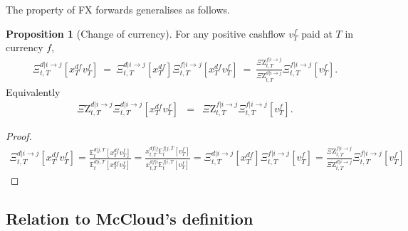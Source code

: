 \documentclass[11pt,english]{amsart}
\newcommand{\EE}{\mathbb{E}}
\newcommand{\Q}{\Xi}
\newcommand{\QZ}{{\Xi\mathrm{Z}}}
\theoremstyle{definition}
\newtheorem{prop}{Proposition}
\newtheorem{rema}{Remark}
\begin{document}
The property of FX forwards generalises as follows.

\begin{prop}[Change of currency]
For any positive cashflow $v^f_T$ paid at $T$ in currency $f$, 
\begin{eqnarray}
  \Q^{d|i\to j}_{t,T}[x^{df}_Tv^f_T]  ~=~  \Q^{d|i\to j}_{t,T}[x^{df}_T] \Q^{f|i\to j}_{t,T}[x^{df}_Tv^f_T]   
  ~=~ \frac{\QZ^{f|i\to j}_{t,T}}{\QZ^{d|i\to j}_{t,T}} \Q^{f|i\to j}_{t,T}[v^f_T] .
\end{eqnarray}
Equivalently 
\begin{eqnarray}
  \QZ^{d|i\to j}_{t,T}\Q^{d|i\to j}_{t,T}[x^{df}_Tv^f_T]  &=& \QZ^{f|i\to j}_{t,T} \Q^{f|i\to j}_{t,T}[v^f_T] .
\end{eqnarray}
\end{prop}

\begin{proof}
\begin{eqnarray*}
  \Q^{d|i\to j}_{t,T}[x^{df}_Tv^f_T] 
  = \frac{\EE^{d|j,T}_t\left[ x^{df}_Tv^f_T\right] } {\EE^{d|i,T}_t\left[ x^{df}_Tv^f_T \right] }   
  = \frac{x^{df|j}_{t,T} \EE^{f|j,T}_t\left[ v^f_T\right] } {x^{df|i}_{t,T} \EE^{f|i,T}_t\left[ v^f_T \right] }   
  = \Q^{d|i\to j}_{t,T}[x^{df}_T]  \Q^{f|i\to j}_{t,T}[v^f_T]  
  = \frac{\QZ^{f|i\to j}_{t,T}}{\QZ^{d|i\to j}_{t,T}} \Q^{f|i\to j}_{t,T}[v^f_T] 
\end{eqnarray*}
\end{proof}


\subsection{Relation to McCloud's definition}
\end{document}
